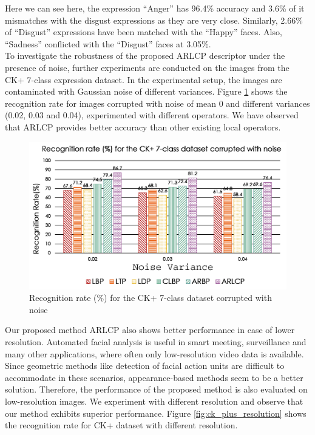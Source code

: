 \documentclass[12pt]{article}
\begin{document}
Here we can see here, the expression ``Anger'' has 96.4\% accuracy and 3.6\% of it mismatches with the disgust expressions as they are very close. Similarly, 2.66\% of ``Disgust'' expressions have been matched with the ``Happy'' faces. Also, ``Sadness'' conflicted with the ``Disgust'' faces at 3.05\%.\\

To investigate the robustness of the proposed ARLCP descriptor under the presence
of noise, further experiments are conducted on the images from the CK+ 7-class expression dataset. In the experimental setup, the images are contaminated with Gaussian noise of different variances. Figure \ref{fig:CK_plus_noisy} shows the recognition rate for images corrupted with noise of mean 0 and different variances (0.02, 0.03 and 0.04), experimented with different operators. We have observed that ARLCP provides better accuracy than other existing local operators.

\begin{figure}[H]
	\begin{center}
		\includegraphics[width=\textwidth]{Picture4.png}			
		\caption{Recognition rate (\%) for the CK+ 7-class dataset corrupted with noise}
		\label{fig:CK_plus_noisy}
	\end{center}
\end{figure}


Our proposed method ARLCP also shows better performance in case of lower resolution. Automated facial analysis is useful in smart meeting, surveillance and many other
applications, where often only low-resolution video data is available. Since geometric
methods like detection of facial action units are difficult to accommodate in these scenarios, appearance-based methods seem to be a better solution. Therefore, the performance of the proposed method is also evaluated on low-resolution images. We experiment with different resolution and observe that our method exhibits superior performance. Figure \ref{fig:ck_plus_resolution} shows the recognition rate for CK+ dataset with different resolution.
\end{document}
